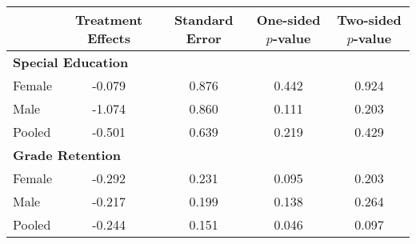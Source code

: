 \begin{tabular}{lcccc} \hline \hline
 & Treatment Effects  & Standard Error  & One-sided $p$-value  & Two-sided $p$-value  \\  \hline  
  \multicolumn{5}{l}{\textbf{Special Education}}\\
Female &     -0.079 &     0.876 &     0.442 &     0.924 \\  
Male &     -1.074 &     0.860 &     0.111 &     0.203 \\  
Pooled &     -0.501 &     0.639 &     0.219 &     0.429 \\  
  \multicolumn{5}{l}{\textbf{Grade Retention}}\\
Female &     -0.292 &     0.231 &     0.095 &     0.203 \\  
Male &     -0.217 &     0.199 &     0.138 &     0.264 \\  
Pooled &     -0.244 &     0.151 &     0.046 &     0.097 \\ 
\hline \hline \end{tabular}